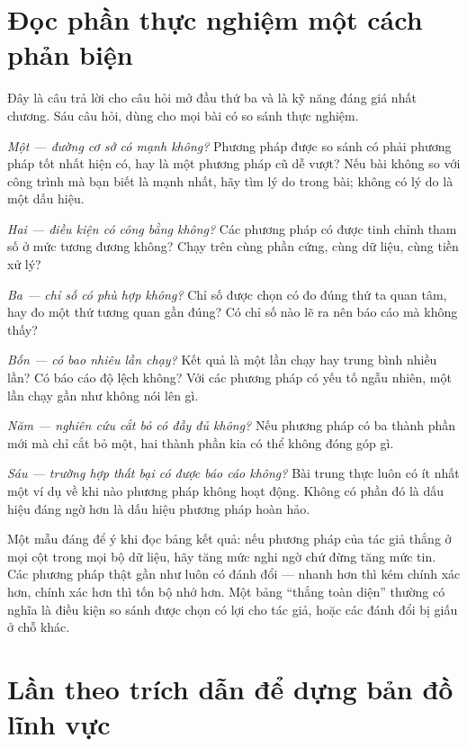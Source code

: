 \documentclass[../../english.tex]{subfiles}
\begin{document}
\section{Đọc phần thực nghiệm một cách phản biện}

Đây là câu trả lời cho câu hỏi mở đầu thứ ba và là kỹ năng đáng giá nhất chương. Sáu câu hỏi, dùng cho mọi bài có so sánh thực nghiệm.

\emph{Một --- đường cơ sở có mạnh không?} Phương pháp được so sánh có phải phương pháp tốt nhất hiện có, hay là một phương pháp cũ dễ vượt? Nếu bài không so với công trình mà bạn biết là mạnh nhất, hãy tìm lý do trong bài; không có lý do là một dấu hiệu.

\emph{Hai --- điều kiện có công bằng không?} Các phương pháp có được tinh chỉnh tham số ở mức tương đương không? Chạy trên cùng phần cứng, cùng dữ liệu, cùng tiền xử lý?

\emph{Ba --- chỉ số có phù hợp không?} Chỉ số được chọn có đo đúng thứ ta quan tâm, hay đo một thứ tương quan gần đúng? Có chỉ số nào lẽ ra nên báo cáo mà không thấy?

\emph{Bốn --- có bao nhiêu lần chạy?} Kết quả là một lần chạy hay trung bình nhiều lần? Có báo cáo độ lệch không? Với các phương pháp có yếu tố ngẫu nhiên, một lần chạy gần như không nói lên gì.

\emph{Năm --- nghiên cứu cắt bỏ có đầy đủ không?} Nếu phương pháp có ba thành phần mới mà chỉ cắt bỏ một, hai thành phần kia có thể không đóng góp gì.

\emph{Sáu --- trường hợp thất bại có được báo cáo không?} Bài trung thực luôn có ít nhất một ví dụ về khi nào phương pháp không hoạt động. Không có phần đó là dấu hiệu đáng ngờ hơn là dấu hiệu phương pháp hoàn hảo.

\begin{cambay}
Một mẫu đáng để ý khi đọc bảng kết quả: nếu phương pháp của tác giả thắng ở mọi cột trong mọi bộ dữ liệu, hãy tăng mức nghi ngờ chứ đừng tăng mức tin. Các phương pháp thật gần như luôn có đánh đổi --- nhanh hơn thì kém chính xác hơn, chính xác hơn thì tốn bộ nhớ hơn. Một bảng ``thắng toàn diện'' thường có nghĩa là điều kiện so sánh được chọn có lợi cho tác giả, hoặc các đánh đổi bị giấu ở chỗ khác.
\end{cambay}

\section{Lần theo trích dẫn để dựng bản đồ lĩnh vực}
\end{document}
